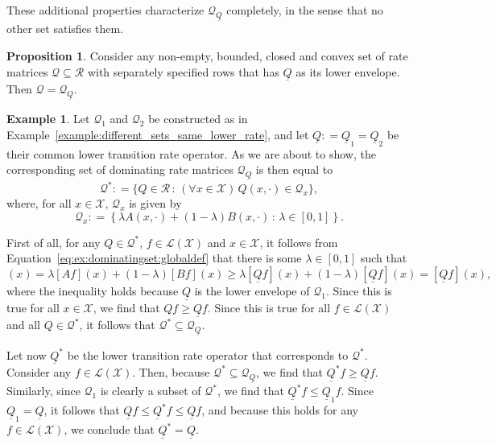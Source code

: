 \documentclass[10pt,a4paper]{paper}
\theoremstyle{definition}
\newtheorem{exmp}{Example}%
\newtheorem{proposition}[theorem]{Proposition}
\newcommand{\states}{\mathcal{X}}
\newcommand{\gambles}{\mathcal{L}}
\newcommand{\gamblesX}{\gambles(\states)}
\newcommand{\rateset}{\mathcal{Q}}
\newcommand{\lrate}{\underline{Q}}
\newcommand{\coloneqq}{:\!=}
\begin{document}
\noindent
These additional properties characterize $\rateset_{\lrate}$ completely, in the sense that no other set satisfies them.

\begin{proposition}\label{prop:dominating_unique_characterization}
Consider any non-empty, bounded, closed and convex set of rate matrices $\rateset\subseteq\mathcal{R}$ with separately specified rows that has $\lrate$ as its lower envelope. Then $\rateset=\rateset_{\lrate}$.
\end{proposition}

\begin{exmp}\label{ex:dominatingset}
Let $\rateset_1$ and $\rateset_2$ be constructed as in Example~\ref{example:different_sets_same_lower_rate}, and let $\lrate\coloneqq\lrate_1=\lrate_2$ be their common lower transition rate operator. As we are about to show, the corresponding set of dominating rate matrices $\rateset_{\lrate}$ is then equal to
\begin{equation}\label{eq:ex:dominatingset:globaldef}
\rateset^* \coloneqq \{Q\in\mathcal{R}\,:\,(\forall x\in\states)\, Q(x,\cdot)\in\rateset_x\},
\end{equation}
where, for all $x\in\states$, $\rateset_x$ is given by
\begin{equation*}
\rateset_x \coloneqq \left\{\lambda A(x,\cdot)+(1-\lambda)B(x,\cdot)\,:\,\lambda\in[0,1]\right\}.
\end{equation*}

First of all, for any $Q\in\rateset^*$, $f\in\gamblesX$ and $x\in\states$, it follows from Equation~\eqref{eq:ex:dominatingset:globaldef} that there is some $\lambda\in[0,1]$ such that
\begin{equation*}
[Qf](x)=\lambda[Af](x)+(1-\lambda)[Bf](x)
\geq\lambda[\lrate f](x)+(1-\lambda)[\lrate f](x)
=[\lrate f](x),
\end{equation*}
where the inequality holds because $\lrate$ is the lower envelope of $\rateset_1$. Since this is true for all $x\in\states$, we find that $Qf\geq\lrate f$. Since this is true for all $f\in\gamblesX$ and all $Q\in\rateset^*$, it follows that $\rateset^*\subseteq\rateset_{\lrate}$. 


Let now $\lrate^*$ be the lower transition rate operator that corresponds to $\rateset^*$. Consider any $f\in\gamblesX$. Then, because $\rateset^*\subseteq\rateset_{\lrate}$, we find that $\lrate^*f\geq\lrate f$. Similarly, since $\rateset_1$ is clearly a subset of $\rateset^*$, we find that $\lrate^*f\leq\lrate_1f$. Since $\lrate_1=\lrate$, it follows that $\lrate f\leq \lrate^*f\leq \lrate f$, and because this holds for any $f\in\gamblesX$, we conclude that $\lrate^*=\lrate$.



\end{exmp}
\end{document}
